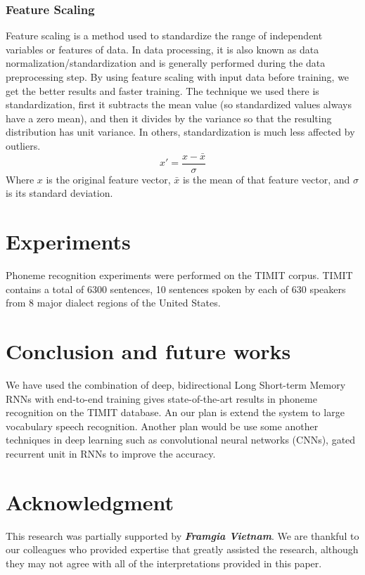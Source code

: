 \documentclass[conference]{IEEEtran}
\begin{document}
\subsubsection{Feature Scaling}
Feature scaling is a method used to standardize the range of independent variables or features of data. In data processing, it is also known as data normalization/standardization and is generally performed during the data preprocessing step. By using feature scaling with input data before training, we get the better results and faster training. The technique we used there is standardization, first it subtracts the mean value (so standardized values always have a zero mean), and then it divides by the variance so that the resulting distribution has unit variance. In others, standardization is much less affected by outliers.
\begin{equation}
	x' = \frac{x - \bar{x}}{\sigma}
\end{equation}
Where ${\displaystyle x}$ is the original feature vector, ${\displaystyle {\bar {x}}}$ is the mean of that feature vector, and ${\displaystyle \sigma }$ is its standard deviation.

\section{Experiments}
Phoneme recognition experiments were performed on the TIMIT corpus. TIMIT contains a total of 6300 sentences, 10 sentences spoken by each of 630 speakers from 8 major dialect regions of the United States.



\section{Conclusion and future works}
We have used the combination of deep, bidirectional Long Short-term Memory RNNs with end-to-end training gives state-of-the-art results in phoneme recognition on the TIMIT database. An our plan is extend the system to large vocabulary speech recognition. Another plan would be use some another techniques in deep learning such as convolutional neural networks (CNNs), gated recurrent unit in RNNs to improve the accuracy.


\section*{Acknowledgment}


This research was partially supported by \textbf{\textit{Framgia Vietnam}}. We are thankful to our colleagues who provided  expertise that greatly assisted the research, although they may not agree with all of the interpretations provided in this paper.
\end{document}
